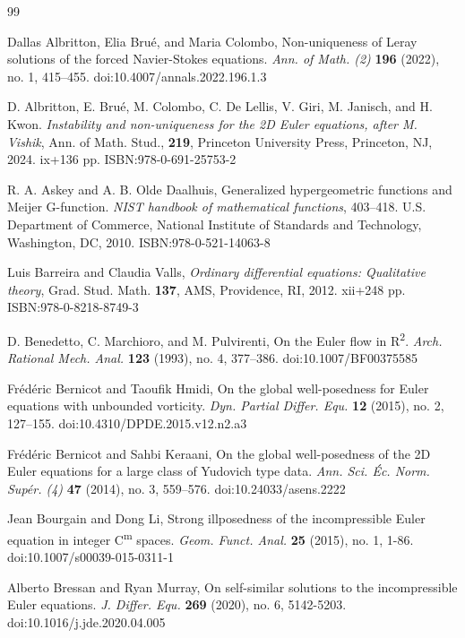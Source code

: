 \documentclass[11pt]{article}
\theoremstyle{definition}
\theoremstyle{remark}
\numberwithin{equation}{section}
\newcommand{\tbf}{\textbf}
\newcommand{\tsup}{\textsuperscript}
\begin{document}
\begin{flushleft}\begin{thebibliography}{99}

 Dallas Albritton, Elia Brué, and Maria Colombo, Non-uniqueness of Leray solutions of the forced Navier-Stokes equations. \textit{Ann. of Math. (2)} \tbf{196} (2022), no. 1, 415–455. doi:10.4007/annals.2022.196.1.3

 D. Albritton, E. Bru\'e, M. Colombo, C. De Lellis, V. Giri, M. Janisch, and H. Kwon. \textit{Instability and non-uniqueness for the 2D Euler equations, after M. Vishik}, Ann. of Math. Stud., \tbf{219}, Princeton University Press, Princeton, NJ, 2024. ix+136 pp. ISBN:978-0-691-25753-2

 R. A. Askey and A. B. Olde Daalhuis, Generalized hypergeometric functions and Meijer G-function. \textit{NIST handbook of mathematical functions}, 403–418. U.S. Department of Commerce, National Institute of Standards and Technology, Washington, DC, 2010. ISBN:978-0-521-14063-8

 Luis Barreira and Claudia Valls, \textit{Ordinary differential equations: Qualitative theory}, Grad. Stud. Math. \tbf{137}, AMS, Providence, RI, 2012. xii+248 pp. ISBN:978-0-8218-8749-3

 D. Benedetto, C. Marchioro, and M. Pulvirenti, On the Euler flow in R\tsup{2}. \textit{Arch. Rational Mech. Anal.} \tbf{123} (1993), no. 4, 377–386. doi:10.1007/BF00375585

 Fr\'ed\'eric Bernicot and Taoufik Hmidi, On the global well-posedness for Euler equations with unbounded vorticity. \textit{Dyn. Partial Differ. Equ.} \tbf{12} (2015), no. 2, 127–155. doi:10.4310/DPDE.2015.v12.n2.a3

 Frédéric Bernicot and Sahbi Keraani, On the global well-posedness of the 2D Euler equations for a large class of Yudovich type data. \textit{Ann. Sci. Éc. Norm. Supér. (4)} \tbf{47} (2014), no. 3, 559–576. doi:10.24033/asens.2222

 Jean Bourgain and Dong Li, Strong illposedness of the incompressible Euler equation in integer C\tsup{m} spaces. \textit{Geom. Funct. Anal.} \tbf{25} (2015), no. 1, 1-86. doi:10.1007/s00039-015-0311-1

 Alberto Bressan and Ryan Murray, On self-similar solutions to the incompressible Euler equations. \textit{J. Differ. Equ.} \tbf{269} (2020), no. 6, 5142-5203. doi:10.1016/j.jde.2020.04.005


\end{thebibliography}
\end{flushleft}
\end{document}
